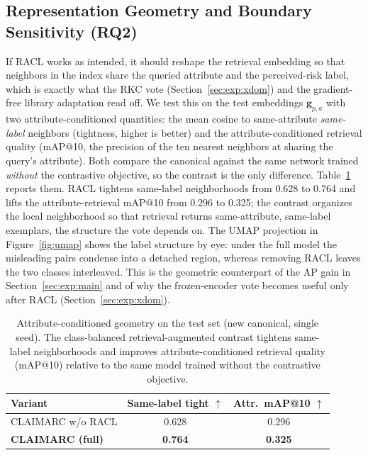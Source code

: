 \documentclass[11pt]{article}
\newcommand{\best}[1]{\textbf{#1}}
\begin{document}
\subsection{Representation Geometry and Boundary Sensitivity (RQ2)}
\label{sec:exp:geom}

If RACL works as intended, it should reshape the retrieval embedding so that
neighbors in the index share the queried attribute and the perceived-risk label,
which is exactly what the RKC vote (Section~\ref{sec:exp:xdom}) and the gradient-free
library adaptation read off. We test this on the test embeddings
$\mathbf{g}_{p,a}$ with two attribute-conditioned quantities: the mean cosine to
same-attribute \emph{same-label} neighbors (tightness, higher is better) and the
attribute-conditioned retrieval quality (mAP@10, the precision of the
ten nearest neighbors at sharing the query's attribute). Both compare the
canonical against the same network trained \emph{without} the contrastive
objective, so the contrast is the only difference. Table~\ref{tab:geom} reports
them. RACL tightens same-label neighborhoods from 0.628 to 0.764 and lifts the
attribute-retrieval mAP@10 from 0.296 to 0.325; the contrast organizes the local
neighborhood so that retrieval returns same-attribute, same-label exemplars, the
structure the vote depends on. The UMAP projection in Figure~\ref{fig:umap} shows
the label structure by eye: under the full model the misleading pairs condense
into a detached region, whereas removing RACL leaves the two classes interleaved.
This is the geometric counterpart of the AP gain in
Section~\ref{sec:exp:main} and of why the frozen-encoder vote becomes useful only
after RACL (Section~\ref{sec:exp:xdom}).

\begin{table}[t]
\centering\small
\setlength{\tabcolsep}{10pt}
\begin{tabular}{lcc}
\toprule
\textbf{Variant} & \textbf{Same-label tight} $\uparrow$ & \textbf{Attr.\ mAP@10} $\uparrow$ \\
\midrule
CLAIMARC w/o RACL        & 0.628 & 0.296 \\
\textbf{CLAIMARC (full)} & \best{0.764} & \best{0.325} \\
\bottomrule
\end{tabular}
\caption{Attribute-conditioned geometry on the test set (new canonical, single
seed). The class-balanced retrieval-augmented contrast tightens same-label
neighborhoods and improves attribute-conditioned retrieval quality (mAP@10)
relative to the same model trained without the contrastive objective.}
\label{tab:geom}
\end{table}
\end{document}
